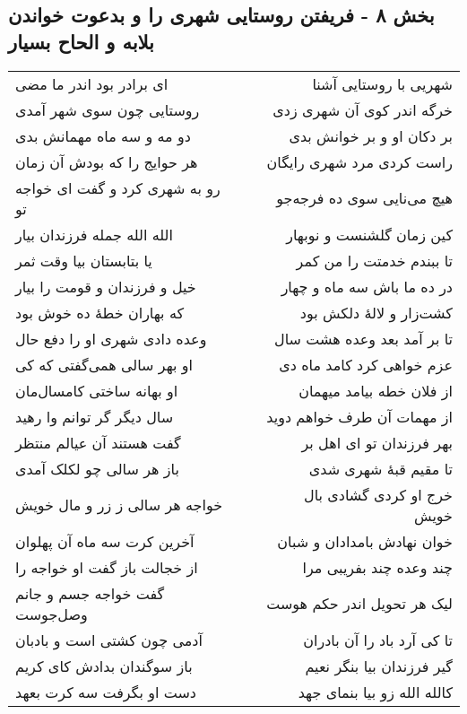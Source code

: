 \begin{center}
\section*{بخش ۸ - فریفتن روستایی شهری را و بدعوت  خواندن بلابه و الحاح بسیار}
\label{sec:sh008}
\begin{longtable}{l p{0.5cm} r}
ای برادر بود اندر ما مضی
&&
شهریی با روستایی آشنا
\\
روستایی چون سوی شهر آمدی
&&
خرگه اندر کوی آن شهری زدی
\\
دو مه و سه ماه مهمانش بدی
&&
بر دکان او و بر خوانش بدی
\\
هر حوایج را که بودش آن زمان
&&
راست کردی مرد شهری رایگان
\\
رو به شهری کرد و گفت ای خواجه تو
&&
هیچ می‌نایی سوی ده فرجه‌جو
\\
الله الله جمله فرزندان بیار
&&
کین زمان گلشنست و نوبهار
\\
یا بتابستان بیا وقت ثمر
&&
تا ببندم خدمتت را من کمر
\\
خیل و فرزندان و قومت را بیار
&&
در ده ما باش سه ماه و چهار
\\
که بهاران خطهٔ ده خوش بود
&&
کشت‌زار و لالهٔ دلکش بود
\\
وعده دادی شهری او را دفع حال
&&
تا بر آمد بعد وعده هشت سال
\\
او بهر سالی همی‌گفتی که کی
&&
عزم خواهی کرد کامد ماه دی
\\
او بهانه ساختی کامسال‌مان
&&
از فلان خطه بیامد میهمان
\\
سال دیگر گر توانم وا رهید
&&
از مهمات آن طرف خواهم دوید
\\
گفت هستند آن عیالم منتظر
&&
بهر فرزندان تو ای اهل بر
\\
باز هر سالی چو لکلک آمدی
&&
تا مقیم قبهٔ شهری شدی
\\
خواجه هر سالی ز زر و مال خویش
&&
خرج او کردی گشادی بال خویش
\\
آخرین کرت سه ماه آن پهلوان
&&
خوان نهادش بامدادان و شبان
\\
از خجالت باز گفت او خواجه را
&&
چند وعده چند بفریبی مرا
\\
گفت خواجه جسم و جانم وصل‌جوست
&&
لیک هر تحویل اندر حکم هوست
\\
آدمی چون کشتی است و بادبان
&&
تا کی آرد باد را آن بادران
\\
باز سوگندان بدادش کای کریم
&&
گیر فرزندان بیا بنگر نعیم
\\
دست او بگرفت سه کرت بعهد
&&
کالله الله زو بیا بنمای جهد
\\

\end{longtable}
\end{center}

